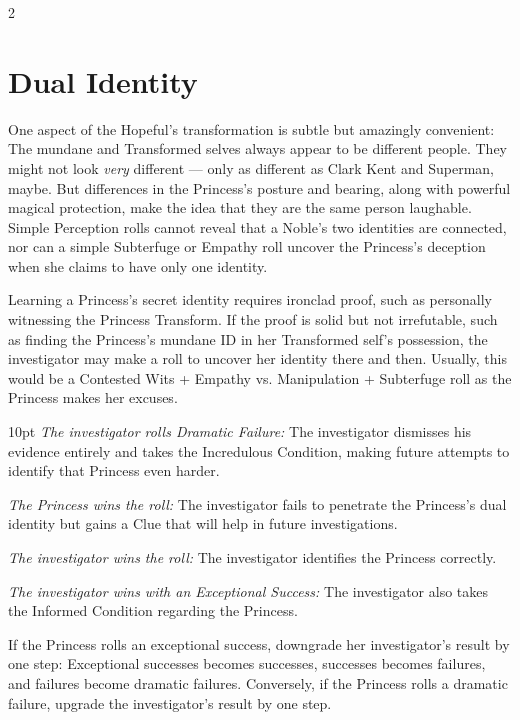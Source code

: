 \begin{multicols}{2}
\section*{Dual Identity}
\label{sec:DualIdentity}

One aspect of the Hopeful's transformation is subtle but amazingly convenient: The mundane and Transformed selves always appear to be different people. They might not look \textit{very} different — only as different as Clark Kent and Superman, maybe. But differences in the Princess's posture and bearing, along with powerful magical protection, make the idea that they are the same person laughable. Simple Perception rolls cannot reveal that a Noble's two identities are connected, nor can a simple Subterfuge or Empathy roll uncover the Princess's deception when she claims to have only one identity. 

Learning a Princess's secret identity requires ironclad proof, such as personally witnessing the Princess Transform. If the proof is solid but not irrefutable, such as finding the Princess's mundane ID in her Transformed self's possession, the investigator may make a roll to uncover her identity there and then. Usually, this would be a Contested Wits + Empathy vs. Manipulation + Subterfuge roll as the Princess makes her excuses. 

\begin{myindentpar}{10pt}
    \emph{The investigator rolls Dramatic Failure:} The investigator dismisses his evidence entirely and takes the Incredulous Condition, making future attempts to identify that Princess even harder. 
    
    \emph{The Princess wins the roll:} The investigator fails to penetrate the Princess's dual identity but gains a Clue that will help in future investigations. 
    
    \emph{The investigator wins the roll:} The investigator identifies the Princess correctly.
    
    \emph{The investigator wins with an Exceptional Success:} The investigator also takes the Informed Condition regarding the Princess. 
\end{myindentpar}

If the Princess rolls an exceptional success, downgrade her investigator's result by one step: Exceptional successes becomes successes, successes becomes failures, and failures become dramatic failures. Conversely, if the Princess rolls a dramatic failure, upgrade the investigator's result by one step.


\end{multicols}
